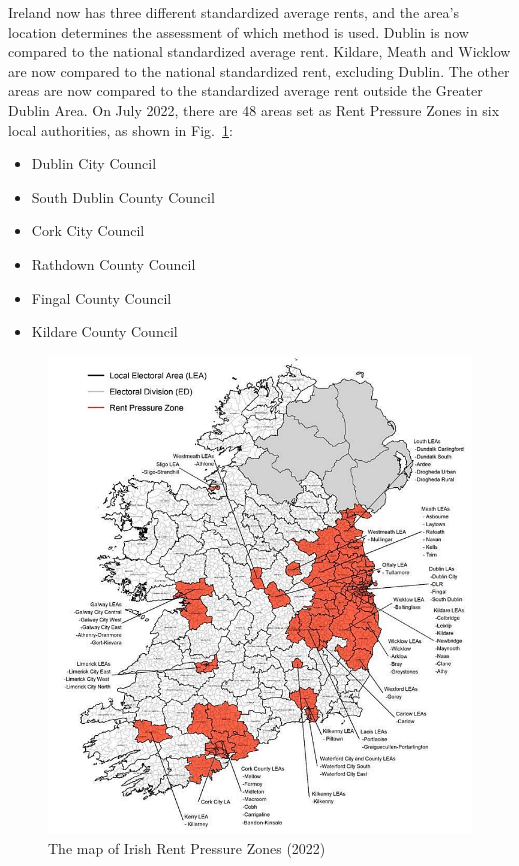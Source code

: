 \documentclass[conference, compsoc]{IEEEtran}
\begin{document}
Ireland now has three different standardized average rents, and the area's location determines the assessment of which method is used.
Dublin is now compared to the national standardized average rent.
Kildare, Meath and Wicklow are now compared to the national standardized rent, excluding Dublin.
The other areas are now compared to the standardized average rent outside the Greater Dublin Area.
On July 2022, there are $48$ areas set as Rent Pressure Zones in six local authorities, as shown in Fig.~\ref{fig:rent-pressure-zone-map}:
\begin{itemize}
    \item Dublin City Council
    \item South Dublin County Council
    \item Cork City Council
    \item Rathdown County Council
    \item Fingal County Council
    \item Kildare County Council
\end{itemize}

\begin{figure}[htbp]
    \centerline{\includegraphics[width=0.9\linewidth]{figures/rent-pressure-zone-map.png}}
    \caption{The map of Irish Rent Pressure Zones (2022) \cite{housing-property-sector-chartpack}}
    \label{fig:rent-pressure-zone-map}
\end{figure}
\end{document}
